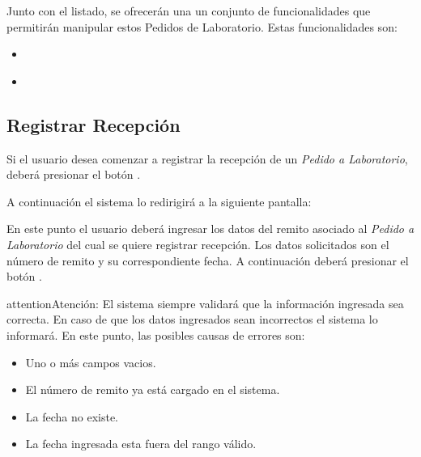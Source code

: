 \documentclass[a4paper,10pt,spanish]{sphinxmanual}
\begin{document}

Junto con el listado, se ofrecerán una un conjunto de funcionalidades que permitirán manipular estos Pedidos de Laboratorio. Estas funcionalidades son:
\begin{itemize}
\item {} 
{\hyperref[receppedidosdelab:registrar\string-recepcion\string-rpl]{}}

\item {} 
{\hyperref[receppedidosdelab:formulario\string-busqueda\string-rpl]{}}

\end{itemize}


\subsection{Registrar Recepción}
\label{receppedidosdelab:registrar-recepcion-rpl}\label{receppedidosdelab:registrar-recepcion}
Si el usuario desea comenzar a registrar la recepción de un \emph{Pedido a Laboratorio}, deberá presionar el botón .


A continuación el sistema lo redirigirá a la siguiente pantalla:


En este punto el usuario deberá ingresar los datos del remito asociado al \emph{Pedido a Laboratorio} del cual se quiere registrar recepción. Los datos solicitados son el número de remito y su correspondiente fecha. A continuación deberá presionar el botón .

\begin{notice}{attention}{Atención:}
El sistema siempre validará que la información ingresada sea correcta. En caso de que los datos ingresados sean incorrectos el sistema lo informará.
En este punto, las posibles causas de errores son:
\begin{itemize}
\item {} 
Uno o más campos vacios.

\item {} 
El número de remito ya está cargado en el sistema.

\item {} 
La fecha no existe.

\item {} 
La fecha ingresada esta fuera del rango válido.

\end{itemize}
\end{notice}
\end{document}
